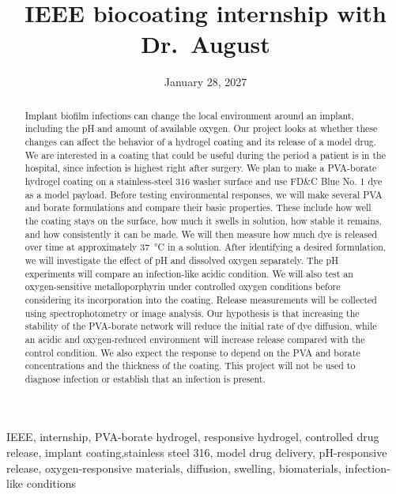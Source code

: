 \documentclass[12pt,conference,onecolumn]{IEEEtran}
\title{{IEEE} biocoating internship with {D}r.~{A}ugust }
\author{%
\IEEEauthorblockN{Omar Ahmadzada}\IEEEauthorblockA{Science \& Engineering\\Manalapan High School\\Englishtown, NJ\\\href{mailto:427oahmadzada@frhsd.com}{427oahmadzada@frhsd.com}}\and
\IEEEauthorblockN{Shreena Desai}\IEEEauthorblockA{Science \& Engineering\\Manalapan High School\\Englishtown, NJ\\\href{mailto:427sdesai@frhsd.com}{427sdesai@frhsd.com}}\and
\IEEEauthorblockN{K August}\IEEEauthorblockA{\href{mailto:kit.august@gmail.com}{kit.august@gmail.com}}
}
\date{January 28, 2027}
\newcommand{\keywords}{IEEE, internship, PVA-borate hydrogel, responsive hydrogel, controlled drug release, implant coating,stainless steel 316, model drug delivery, pH-responsive release, oxygen-responsive materials, diffusion, swelling, biomaterials, infection-like conditions}
\begin{document}
\maketitle 

\begin{abstract}
Implant biofilm infections can change the local environment around an implant, including the pH and amount of available oxygen. Our project looks at whether these changes can affect the behavior of a hydrogel coating and its release of a model drug. We are interested in a coating that could be useful during the period a patient is in the hospital, since infection is highest right after surgery. We plan to make a PVA-borate hydrogel coating on a stainless-steel 316 washer surface and use FD\&C Blue No. 1 dye as a model payload. Before testing environmental responses, we will make several PVA and borate formulations and compare their basic properties. These include how well the coating stays on the surface, how much it swells in solution, how stable it remains, and how consistently it can be made. We will then measure how much dye is released over time at approximately \qty{37}{\celsius} in a solution. After identifying a desired formulation, we will investigate the effect of pH and dissolved oxygen separately. The pH experiments will compare an infection-like acidic condition. We will also test an oxygen-sensitive metalloporphyrin under controlled oxygen conditions before considering its incorporation into the coating. Release measurements will be collected using spectrophotometry or image analysis. Our hypothesis is that increasing the stability of the PVA-borate network will reduce the initial rate of dye diffusion, while an acidic and oxygen-reduced environment will increase release compared with the control condition. We also expect the response to depend on the PVA and borate concentrations and the thickness of the coating. This project will not be used to diagnose infection or establish that an infection is present.
\end{abstract}

\begin{IEEEkeywords}
\keywords
\end{IEEEkeywords}
\end{document}

